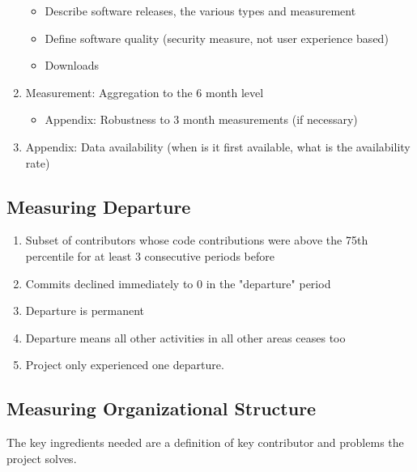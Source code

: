 \documentclass[12pt,notitlepage]{article}
\begin{document}
\begin{enumerate}
    \begin{itemize}
        \item Describe software releases, the various types and measurement
        \item Define software quality (security measure, not user experience based)
        \item Downloads
    \end{itemize}
    \item Measurement: Aggregation to the 6 month level
    \begin{itemize}
        \item Appendix: Robustness to 3 month measurements (if necessary)
    \end{itemize}
    \item Appendix: Data availability (when is it first available, what is the availability rate)
\end{enumerate}
\subsection{Measuring Departure}
\begin{enumerate}
    \item Subset of contributors whose code contributions were above the 75th percentile for at least 3 consecutive periods before
    \item Commits declined immediately to 0 in the "departure" period
    \item Departure is permanent
    \item Departure means all other activities in all other areas ceases too 
    \item Project only experienced one departure. 
\end{enumerate}
\subsection{Measuring Organizational Structure}
The key ingredients needed are a definition of key contributor and  problems the project solves. 
\end{document}
